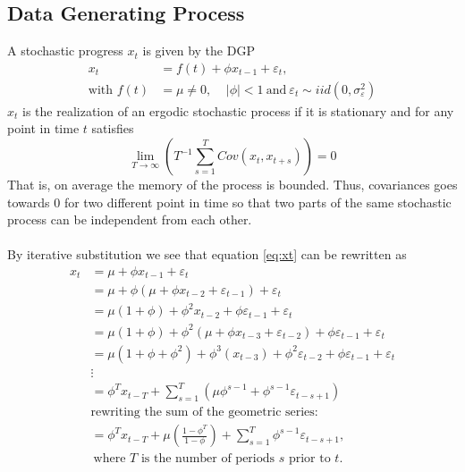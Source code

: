 \subsection{Data Generating Process}
A stochastic progress $x_t$ is given by the DGP
\begin{equation}
  \begin{split}
    x_t &= f(t) + \phi x_{t-1}+\varepsilon_t,\\
    \text{with }f(t) &= \mu \neq 0,\ \ \ \ \ |\phi|<1\ \text{and}\ \varepsilon_t\sim iid(0,\sigma^2_\varepsilon)
    \label{eq:xt}
  \end{split}
\end{equation}
$x_t$ is the realization of an ergodic stochastic process if it is stationary and for any point in time $t$ satisfies
\begin{equation}
  \displaystyle{\lim_{T\to\infty}}\left(T^{-1}\sum_{s=1}^TCov(x_t,x_{t+s})\right)=0
\end{equation}
That is, on average the memory of the process is bounded. Thus, covariances goes towards $0$ for two different point in time so that two parts of the same stochastic process can be independent from each other.
\\ \\
By iterative substitution we see that equation \ref{eq:xt} can be rewritten as
\begin{equation}
  \begin{split}
    x_t &= \mu + \phi x_{t-1} +\varepsilon_t \\
        &= \mu + \phi (\mu + \phi x_{t-2}+\varepsilon_{t-1}) +\varepsilon_t\\
        &= \mu (1+\phi) + \phi^2 x_{t-2}+ \phi\varepsilon_{t-1} +\varepsilon_t\\
        &= \mu (1+\phi) + \phi^2 (\mu + \phi x_{t-3}+\varepsilon_{t-2})+ \phi\varepsilon_{t-1}+\varepsilon_t\\
        &= \mu (1+\phi+\phi^2) + \phi^3(x_{t-3})+ \phi^2\varepsilon_{t-2} + \phi\varepsilon_{t-1} +\varepsilon_t\\
        &\vdots \\
        &= \phi^T x_{t-T} + \sum_{s=1}^T\left( \mu\phi^{s-1} + \phi^{s-1}\varepsilon_{t-s+1} \right)\\
        &\text{rewriting the sum of the geometric series:}\\
        &= \phi^T x_{t-T} + \mu\left(\frac{1-\phi^T}{1-\phi}\right) + \sum_{s=1}^T \phi^{s-1}\varepsilon_{t-s+1},\\
        &\ \text{where $T$ is the number of periods $s$ prior to $t$.}
        \label{eq:iterative}
  \end{split}
\end{equation}
